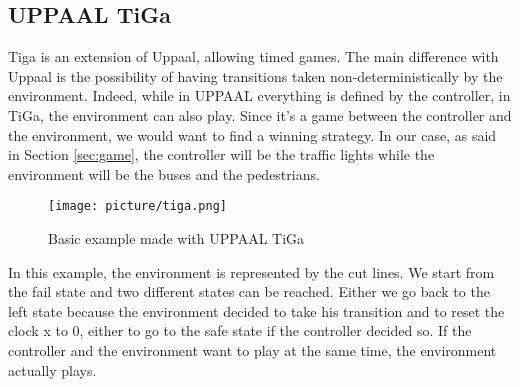\subsection{UPPAAL TiGa}
 Tiga is an extension of Uppaal, allowing timed games. The main difference with Uppaal is the possibility of having transitions taken non-deterministically by the environment. Indeed, while in UPPAAL everything is defined by the controller, in TiGa, the environment can also play. Since it's a game between the controller and the environment, we would want to find a winning strategy. In our case, as said in Section \ref{sec:game}, the controller will be the traffic lights while the environment will be the buses and the pedestrians.
 \begin{figure}[H]\label{fig:tiga}
  \begin{center}
    \texttt{[image: picture/tiga.png]}
    \caption{Basic example made with UPPAAL TiGa}
  \end{center}
\end{figure}
In this example, the environment is represented by the cut lines. We start from the fail state and two different states can be reached. Either we go back to the left state because the environment decided to take his transition and to reset the clock x to 0, either to go to the safe state if the controller decided so. If the controller and the environment want to play at the same time, the environment actually plays.